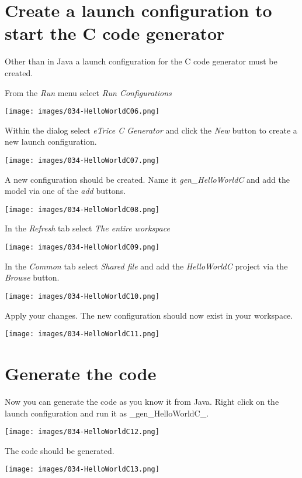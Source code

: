 \section{Create a launch configuration to start the C code generator}

Other than in Java a launch configuration for the C code generator must be created.

From the \textit{Run} menu select \textit{Run Configurations}

\texttt{[image: images/034-HelloWorldC06.png]}

Within the dialog select \textit{eTrice C Generator} and click the \textit{New} button to create a new launch configuration.

\texttt{[image: images/034-HelloWorldC07.png]}

A new configuration should be created. Name it \textit{gen\_HelloWorldC} and add the model via one of the \textit{add} buttons.

\texttt{[image: images/034-HelloWorldC08.png]}

In the \textit{Refresh} tab select \textit{The entire workspace} 

\texttt{[image: images/034-HelloWorldC09.png]}

In the \textit{Common} tab select \textit{Shared file} and add the \textit{HelloWorldC} project via the \textit{Browse} button.

\texttt{[image: images/034-HelloWorldC10.png]}

Apply your changes. The new configuration should now exist in your workspace.

\texttt{[image: images/034-HelloWorldC11.png]}


\section{Generate the code}

Now you can generate the code as you know it from Java. Right click on the launch configuration and run it as _gen_HelloWorldC_.

\texttt{[image: images/034-HelloWorldC12.png]}

The code should be generated.

\texttt{[image: images/034-HelloWorldC13.png]}

